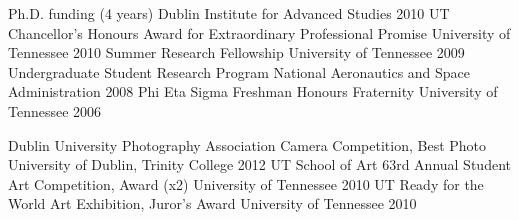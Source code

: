 \begin{cvpress}
  \cvpres
    {Ph.D. funding (4 years)}
    {Dublin Institute for Advanced Studies}
    {2010}
  \cvpres
    {UT Chancellor's Honours Award for Extraordinary Professional Promise}
    {University of Tennessee}
    {2010}
  \cvpres
    {Summer Research Fellowship}
    {University of Tennessee}
    {2009}
  \cvpres
    {Undergraduate Student Research Program}
    {National Aeronautics and Space Administration}
    {2008}
  \cvpres
    {Phi Eta Sigma Freshman Honours Fraternity}
    {University of Tennessee}
    {2006}
\end{cvpress}

\begin{cvpress}
  \cvpres
    {Dublin University Photography Association Camera Competition, Best Photo}
    {University of Dublin, Trinity College}
    {2012}
  \cvpres
    {UT School of Art 63rd Annual Student Art Competition, Award (x2)}
    {University of Tennessee}
    {2010}
  \cvpres
    {UT Ready for the World Art Exhibition, Juror's Award}
    {University of Tennessee}
    {2010}
\end{cvpress}
